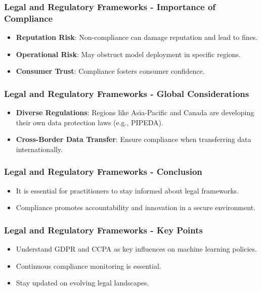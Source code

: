 \documentclass[aspectratio=169]{beamer}
\begin{document}
\begin{frame}[fragile]
    \frametitle{Legal and Regulatory Frameworks - Importance of Compliance}
    \begin{itemize}
        \item \textbf{Reputation Risk}: Non-compliance can damage reputation and lead to fines.
        \item \textbf{Operational Risk}: May obstruct model deployment in specific regions.
        \item \textbf{Consumer Trust}: Compliance fosters consumer confidence.
    \end{itemize}
\end{frame}

\begin{frame}[fragile]
    \frametitle{Legal and Regulatory Frameworks - Global Considerations}
    \begin{itemize}
        \item \textbf{Diverse Regulations}: Regions like Asia-Pacific and Canada are developing their own data protection laws (e.g., PIPEDA).
        \item \textbf{Cross-Border Data Transfer}: Ensure compliance when transferring data internationally.
    \end{itemize}
\end{frame}

\begin{frame}[fragile]
    \frametitle{Legal and Regulatory Frameworks - Conclusion}
    \begin{itemize}
        \item It is essential for practitioners to stay informed about legal frameworks.
        \item Compliance promotes accountability and innovation in a secure environment.
    \end{itemize}
\end{frame}

\begin{frame}[fragile]
    \frametitle{Legal and Regulatory Frameworks - Key Points}
    \begin{itemize}
        \item Understand GDPR and CCPA as key influences on machine learning policies.
        \item Continuous compliance monitoring is essential.
        \item Stay updated on evolving legal landscapes.
    \end{itemize}
\end{frame}
\end{document}

